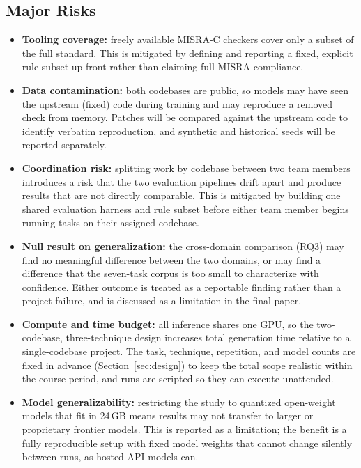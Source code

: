 \documentclass[12pt]{article}
\begin{document}
\subsection{Major Risks}
\begin{itemize}
    \item \textbf{Tooling coverage:} freely available MISRA-C checkers cover only a subset of the full standard. This is mitigated by defining and reporting a fixed, explicit rule subset up front rather than claiming full MISRA compliance.
    \item \textbf{Data contamination:} both codebases are public, so models may have seen the upstream (fixed) code during training and may reproduce a removed check from memory. Patches will be compared against the upstream code to identify verbatim reproduction, and synthetic and historical seeds will be reported separately.
    \item \textbf{Coordination risk:} splitting work by codebase between two team members introduces a risk that the two evaluation pipelines drift apart and produce results that are not directly comparable. This is mitigated by building one shared evaluation harness and rule subset before either team member begins running tasks on their assigned codebase.
    \item \textbf{Null result on generalization:} the cross-domain comparison (RQ3) may find no meaningful difference between the two domains, or may find a difference that the seven-task corpus is too small to characterize with confidence. Either outcome is treated as a reportable finding rather than a project failure, and is discussed as a limitation in the final paper.
    \item \textbf{Compute and time budget:} all inference shares one GPU, so the two-codebase, three-technique design increases total generation time relative to a single-codebase project. The task, technique, repetition, and model counts are fixed in advance (Section~\ref{sec:design}) to keep the total scope realistic within the course period, and runs are scripted so they can execute unattended.
    \item \textbf{Model generalizability:} restricting the study to quantized open-weight models that fit in 24\,GB means results may not transfer to larger or proprietary frontier models. This is reported as a limitation; the benefit is a fully reproducible setup with fixed model weights that cannot change silently between runs, as hosted API models can.
\end{itemize}
\end{document}
